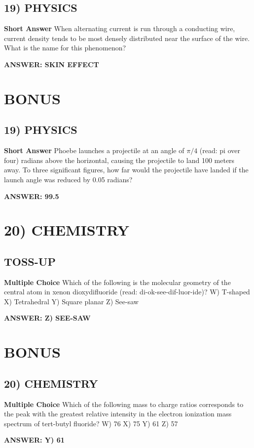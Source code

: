 \documentclass{article}
\begin{document}
\subsection*{19) PHYSICS}
\textbf{Short Answer} When alternating current is run through a conducting wire, current density tends to be most densely distributed near the surface of the wire.
What is the name for this phenomenon?

\textbf{ANSWER: SKIN EFFECT}

\section*{BONUS}
\subsection*{19) PHYSICS}
\textbf{Short Answer} Phoebe launches a projectile at an angle of $\pi/4$ (read: pi over four) radians above the horizontal, causing the projectile to land 100 meters away.
To three significant figures, how far would the projectile have landed if the launch angle was reduced by 0.05 radians?

\textbf{ANSWER: 99.5}

\section*{20) CHEMISTRY}
\subsection*{TOSS-UP}
\textbf{Multiple Choice} Which of the following is the molecular geometry of the central atom in xenon dioxydifluoride (read: di-ok-see-dif-luor-ide)?
W) T-shaped
X) Tetrahedral
Y) Square planar
Z) See-saw

\textbf{ANSWER: Z) SEE-SAW}

\section*{BONUS}
\subsection*{20) CHEMISTRY}
\textbf{Multiple Choice} Which of the following mass to charge ratios corresponds to the peak with the greatest relative intensity in the electron ionization mass spectrum of tert-butyl fluoride?
W) 76
X) 75
Y) 61
Z) 57

\textbf{ANSWER: Y) 61}
\end{document}
